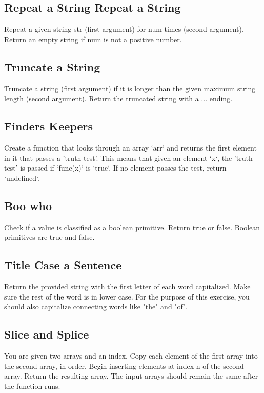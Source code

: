 \documentclass{article}%
\begin{document}
%
\subsection{Repeat a String Repeat a String}%
\label{subsec:RepeataStringRepeataString}%
Repeat a given string str (first argument) for num times (second argument). Return an empty string if num is not a positive number.\newline%

%
\subsection{Truncate a String}%
\label{subsec:TruncateaString}%
Truncate a string (first argument) if it is longer than the given maximum string length (second argument). Return the truncated string with a ... ending.\newline%

%
\subsection{Finders Keepers}%
\label{subsec:FindersKeepers}%
Create a function that looks through an array `arr` and returns the first element in it that passes a 'truth test'. This means that given an element `x`, the 'truth test' is passed if `func(x)` is `true`. If no element passes the test, return `undefined`.\newline%

%
\subsection{Boo who}%
\label{subsec:Boowho}%
Check if a value is classified as a boolean primitive. Return true or false.\newline%
Boolean primitives are true and false.\newline%

%
\subsection{Title Case a Sentence}%
\label{subsec:TitleCaseaSentence}%
Return the provided string with the first letter of each word capitalized. Make sure the rest of the word is in lower case.\newline%
For the purpose of this exercise, you should also capitalize connecting words like "the" and "of".\newline%

%
\subsection{Slice and Splice}%
\label{subsec:SliceandSplice}%
You are given two arrays and an index.\newline%
Copy each element of the first array into the second array, in order.\newline%
Begin inserting elements at index n of the second array.\newline%
Return the resulting array. The input arrays should remain the same after the function runs.\newline%
\end{document}
